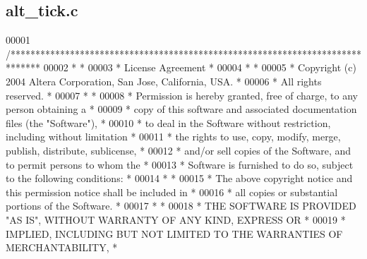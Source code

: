\subsection{alt\+\_\+tick.\+c}
\label{alt__tick_8c_source}

\begin{DoxyCode}
00001 \textcolor{comment}{/******************************************************************************}
00002 \textcolor{comment}{*                                                                             *}
00003 \textcolor{comment}{* License Agreement                                                           *}
00004 \textcolor{comment}{*                                                                             *}
00005 \textcolor{comment}{* Copyright (c) 2004 Altera Corporation, San Jose, California, USA.           *}
00006 \textcolor{comment}{* All rights reserved.                                                        *}
00007 \textcolor{comment}{*                                                                             *}
00008 \textcolor{comment}{* Permission is hereby granted, free of charge, to any person obtaining a     *}
00009 \textcolor{comment}{* copy of this software and associated documentation files (the "Software"),  *}
00010 \textcolor{comment}{* to deal in the Software without restriction, including without limitation   *}
00011 \textcolor{comment}{* the rights to use, copy, modify, merge, publish, distribute, sublicense,    *}
00012 \textcolor{comment}{* and/or sell copies of the Software, and to permit persons to whom the       *}
00013 \textcolor{comment}{* Software is furnished to do so, subject to the following conditions:        *}
00014 \textcolor{comment}{*                                                                             *}
00015 \textcolor{comment}{* The above copyright notice and this permission notice shall be included in  *}
00016 \textcolor{comment}{* all copies or substantial portions of the Software.                         *}
00017 \textcolor{comment}{*                                                                             *}
00018 \textcolor{comment}{* THE SOFTWARE IS PROVIDED "AS IS", WITHOUT WARRANTY OF ANY KIND, EXPRESS OR  *}
00019 \textcolor{comment}{* IMPLIED, INCLUDING BUT NOT LIMITED TO THE WARRANTIES OF MERCHANTABILITY,    *}

\end{DoxyCode}
